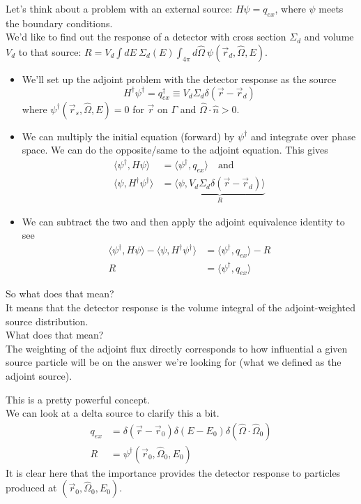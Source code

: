 \documentclass[12pt]{article}
\newcommand{\rvec}{\ensuremath{\vec{r}}}
\newcommand{\vOmega}{\ensuremath{\hat{\Omega}}}
\begin{document}
Let's think about a problem with an external source: $H \psi = q_{ex}$, where $\psi$ meets the boundary conditions.\\
We'd like to find out the response of a detector with cross section $\Sigma_d$ and volume $V_d$ to that source: $R = V_d \int dE\: \Sigma_d(E) \int_{4\pi} d\vOmega \: \psi(\rvec_d, \vOmega, E)$. \\
\begin{itemize}
\item We'll set up the adjoint problem with the detector response as the source
\[H^{\dagger}\psi^{\dagger} = q_{ex}^{\dagger} \equiv V_d \Sigma_d \delta(\rvec - \rvec_d)\]
where $\psi^{\dagger}(\vec{r}_s, \vOmega, E) = 0$ for $\rvec$ on $\Gamma$ and $\vOmega \cdot \hat{n} > 0$.
%
\item We can multiply the initial equation (forward) by $\psi^{\dagger}$ and integrate over phase space. We can do the opposite/same to the adjoint equation. This gives
\begin{align*}
\langle\psi^{\dagger}, H\psi\rangle &= \langle\psi^{\dagger}, q_{ex}\rangle \quad \text{and}\\
\langle\psi, H^{\dagger} \psi^{\dagger}\rangle &= \underbrace{\langle\psi, V_d \Sigma_d \delta(\rvec - \rvec_d)\rangle }_R
\end{align*}
%
\item We can subtract the two and then apply the adjoint equivalence identity to see
\begin{align*}
\langle\psi^{\dagger}, H\psi\rangle - \langle\psi, H^{\dagger} \psi^{\dagger}\rangle &= \langle\psi^{\dagger}, q_{ex}\rangle - R \\
R &= \langle\psi^{\dagger}, q_{ex}\rangle
\end{align*}
\end{itemize}
%
So what does that mean? \\
It means that the detector response is the volume integral of the adjoint-weighted source distribution. \\
What does that mean? \\
The weighting of the adjoint flux directly corresponds to how influential a given source particle will be on the answer we're looking for (what we defined as the adjoint source).

This is a pretty powerful concept. \\
We can look at a delta source to clarify this a bit.
\begin{align*}
q_{ex} &= \delta(\rvec - \rvec_0) \delta(E - E_0) \delta(\vOmega \cdot \vOmega_0) \\
R &= \psi^{\dagger}(\rvec_0, \vOmega_0, E_0)
\end{align*}
It is clear here that the importance provides the detector response to particles produced at $(\rvec_0, \vOmega_0, E_0)$.
\end{document}
